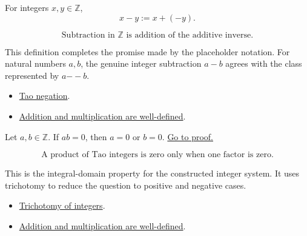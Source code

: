 \begin{definition}[Subtraction]
\label{def:int-subtraction}
For integers \(x,y\in\mathbb{Z}\),
\[
  x-y := x+(-y).
\]
\end{definition}

\begin{remark*}
\[
  \text{Subtraction in } \mathbb{Z} \text{ is addition of the additive inverse.}
\]
\end{remark*}

\begin{remark*}[Interpretation]
This definition completes the promise made by the placeholder notation. For
natural numbers \(a,b\), the genuine integer subtraction \(a-b\) agrees with
the class represented by \(a {-\!\!-} b\).
\end{remark*}

\begin{dependencies}
\begin{itemize}
  \item \hyperref[def:tao-negation]{Tao negation}.
  \item \hyperref[lem:int-well-defined]{Addition and multiplication are well-defined}.
\end{itemize}
\end{dependencies}

\begin{proposition}
\label{prop:int-no-zero-div}
Let \(a,b\in\mathbb{Z}\). If \(ab=0\), then \(a=0\) or \(b=0\).
\hyperref[prf:int-no-zero-div]{Go to proof.}
\end{proposition}

\begin{remark*}
\[
  \text{A product of Tao integers is zero only when one factor is zero.}
\]
\end{remark*}

\begin{remark*}[Interpretation]
This is the integral-domain property for the constructed integer system. It
uses trichotomy to reduce the question to positive and negative cases.
\end{remark*}

\begin{dependencies}
\begin{itemize}
  \item \hyperref[lem:int-trichotomy]{Trichotomy of integers}.
  \item \hyperref[lem:int-well-defined]{Addition and multiplication are well-defined}.
\end{itemize}
\end{dependencies}

